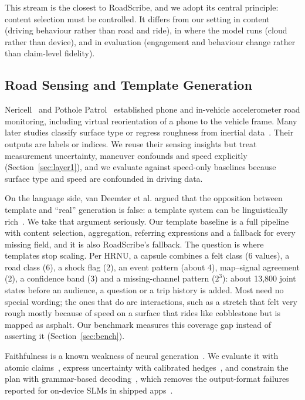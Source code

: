 This stream is the closest to RoadScribe, and we adopt its central principle: content selection must be controlled.
It differs from our setting in content (driving behaviour rather than road and ride), in where the model runs (cloud rather than device), and in evaluation (engagement and behaviour change rather than claim-level fidelity).

\subsection{Road Sensing and Template Generation}

Nericell~\cite{mohan2008nericell} and Pothole Patrol~\cite{eriksson2008pothole} established phone and in-vehicle accelerometer road monitoring, including virtual reorientation of a phone to the vehicle frame.
Many later studies classify surface type or regress roughness from inertial data~\cite{menegazzo2021pvs}.
Their outputs are labels or indices.
We reuse their sensing insights but treat measurement uncertainty, maneuver confounds and speed explicitly (Section~\ref{sec:layer1}), and we evaluate against speed-only baselines because surface type and speed are confounded in driving data.

On the language side, van Deemter et al. argued that the opposition between template and ``real'' generation is false: a template system can be linguistically rich~\cite{vandeemter2005templates}.
We take that argument seriously.
Our template baseline is a full pipeline with content selection, aggregation, referring expressions and a fallback for every missing field, and it is also RoadScribe's fallback.
The question is where templates stop scaling.
Per HRNU, a capsule combines a felt class (6 values), a road class (6), a shock flag (2), an event pattern (about 4), map--signal agreement (2), a confidence band (3) and a missing-channel pattern ($2^3$): about 13{,}800 joint states before an audience, a question or a trip history is added.
Most need no special wording; the ones that do are interactions, such as a stretch that felt very rough mostly because of speed on a surface that rides like cobblestone but is mapped as asphalt.
Our benchmark measures this coverage gap instead of asserting it (Section~\ref{sec:bench}).

Faithfulness is a known weakness of neural generation~\cite{ji2023hallucination}.
We evaluate it with atomic claims~\cite{min2023factscore,wiseman2017challenges}, express uncertainty with calibrated hedges~\cite{kent1964wep,mielke2022linguistic}, and constrain the plan with grammar-based decoding~\cite{geng2023grammar,ggerganov_llamacpp}, which removes the output-format failures reported for on-device SLMs in shipped apps~\cite{oliveira2026lessismore}.

